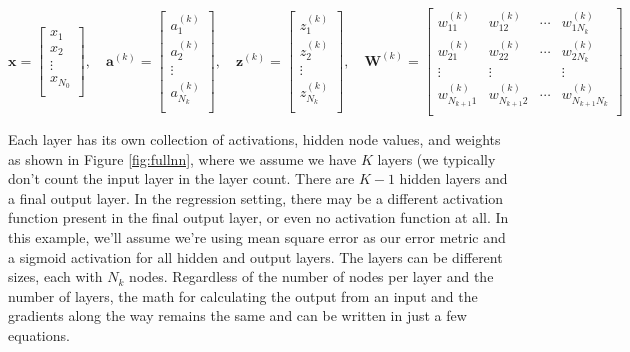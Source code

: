 \documentclass{article}
\begin{document}
\begin{equation}
\mathbf{x} = 
    \begin{bmatrix}
        x_{1}\\
        x_{2}\\
        \vdots\\
        x_{N_{0}}\\
    \end{bmatrix}, \quad
    \mathbf{a}^{(k)} = 
    \begin{bmatrix}
        a_1^{(k)}\\
        a_2^{(k)}\\
        \vdots\\
        a_{N_k}^{(k)}\\
    \end{bmatrix}, \quad
    \mathbf{z}^{(k)} = 
    \begin{bmatrix}
        z_1^{(k)}\\
        z_2^{(k)}\\
        \vdots\\
        z_{N_k}^{(k)}\\
    \end{bmatrix}, \quad
    \mathbf{W}^{(k)} = 
    \begin{bmatrix}
        w_{11}^{(k)} & w_{12}^{(k)} & \cdots & w_{1 N_k}^{(k)}\\[2ex]
        w_{21}^{(k)} & w_{22}^{(k)} & \cdots & w_{2 N_k}^{(k)}\\[2ex]
        \vdots & \vdots &  & \vdots\\[2ex]
        w_{N_{k+1} 1}^{(k)} & w_{N_{k+1} 2}^{(k)} & \cdots & w_{N_{k+1} N_k }^{(k)}\\[2ex]
    \end{bmatrix}
\end{equation}

Each layer has its own collection of activations, hidden node values, and weights as shown in Figure \ref{fig:fullnn}, where we assume we have $K$ layers (we typically don't count the input layer in the layer count. There are $K-1$ hidden layers and a final output layer. In the regression setting, there may be a different activation function present in the final output layer, or even no activation function at all. In this example, we'll assume we're using mean square error as our error metric and a sigmoid activation for all hidden and output layers. The layers can be different sizes, each with $N_k$ nodes. Regardless of the number of nodes per layer and the number of layers, the math for calculating the output from an input and the gradients along the way remains the same and can be written in just a few equations.
\end{document}
